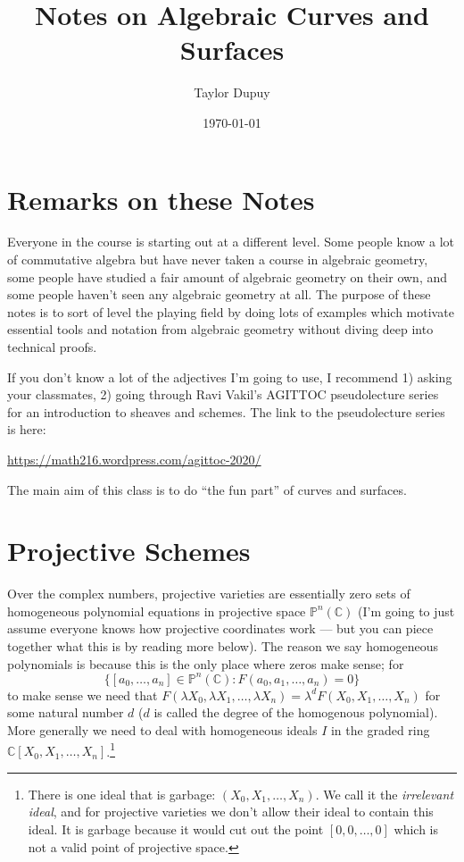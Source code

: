 \documentclass[12pt]{article}
\title{Notes on Algebraic Curves and Surfaces}
\date{\today}
\author{Taylor Dupuy}
\numberwithin{equation}{section}
\theoremstyle{definition}
\theoremstyle{remark}
\newcommand{\CC}{\mathbb{C}}
\newcommand{\PP}{\mathbb{P}}
\begin{document}
\maketitle

\tableofcontents

\section{Remarks on these Notes}
Everyone in the course is starting out at a different level. 
Some people know a lot of commutative algebra but have never taken a course in algebraic geometry, some people have studied a fair amount of algebraic geometry on their own, and some people haven't seen any algebraic geometry at all. 
The purpose of these notes is to sort of level the playing field by doing lots of examples which motivate essential tools and notation from algebraic geometry without diving deep into technical proofs. 

If you don't know a lot of the adjectives I'm going to use, I recommend 1) asking your classmates, 2) going through Ravi Vakil's AGITTOC pseudolecture series for an introduction to sheaves and schemes. The link to the pseudolecture series is here:
\begin{center}
\url{https://math216.wordpress.com/agittoc-2020/}
\end{center}
The main aim of this class is to do ``the fun part'' of curves and surfaces.

\section{Projective Schemes}
Over the complex numbers, projective varieties are essentially zero sets of homogeneous polynomial equations in projective space $\PP^n(\CC)$ (I'm going to just assume everyone knows how projective coordinates work --- but you can piece together what this is by reading more below). 
The reason we say homogeneous polynomials is because this is the only place where zeros make sense; for 
$$\lbrace [a_0,\ldots,a_n] \in \PP^n(\CC) \colon F(a_0,a_1,\ldots,a_n)=0 \rbrace $$
to make sense we need that $F(\lambda X_0,\lambda X_1,\ldots, \lambda X_n)= \lambda^d F(X_0,X_1,\ldots,X_n)$ for some natural number $d$ ($d$ is called the degree of the homogenous polynomial). 
More generally we need to deal with homogeneous ideals $I$ in the graded ring $\CC[X_0,X_1,\ldots,X_n]$.\footnote{There is one ideal that is garbage: $( X_0,X_1,\ldots, X_n) $. 
We call it the \emph{irrelevant ideal}, and for projective varieties we don't allow their ideal to contain this ideal. It is garbage because it would cut out the point $[0,0,\ldots,0]$ which is not a valid point of projective space.}
\end{document}
